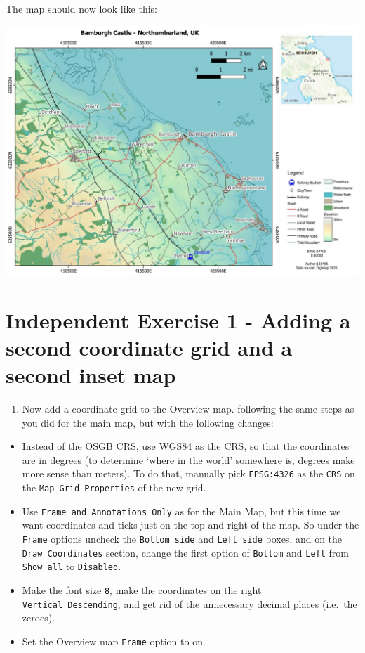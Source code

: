 \documentclass[
  letterpaper,
  DIV=11,
  numbers=noendperiod]{scrreprt}
\providecommand{\tightlist}{%
  \setlength{\itemsep}{0pt}\setlength{\parskip}{0pt}}\usepackage{longtable,booktabs,array}
\begin{document}
The map should now look like this:

\includegraphics{images/lab_8/lab8_fig20_almost__almost_done.jpg}

\section{Independent Exercise 1 - Adding a second coordinate grid and a
second inset
map}\label{independent-exercise-1---adding-a-second-coordinate-grid-and-a-second-inset-map}

\begin{enumerate}
\def\labelenumi{\arabic{enumi})}
\tightlist
\item
  Now add a coordinate grid to the Overview map. following the same
  steps as you did for the main map, but with the following changes:
\end{enumerate}

\begin{itemize}
\item
  Instead of the OSGB CRS, use WGS84 as the CRS, so that the coordinates
  are in degrees (to determine `where in the world' somewhere is,
  degrees make more sense than meters). To do that, manually pick
  \texttt{EPSG:4326} as the \texttt{CRS} on the
  \texttt{Map\ Grid\ Properties} of the new grid.
\item
  Use \texttt{Frame\ and\ Annotations\ Only} as for the Main Map, but
  this time we want coordinates and ticks just on the top and right of
  the map. So under the \texttt{Frame} options uncheck the
  \texttt{Bottom\ side} and \texttt{Left\ side} boxes, and on the
  \texttt{Draw\ Coordinates} section, change the first option of
  \texttt{Bottom} and \texttt{Left} from \texttt{Show\ all} to
  \texttt{Disabled}.
\item
  Make the font size \texttt{8}, make the coordinates on the right
  \texttt{Vertical\ Descending}, and get rid of the unnecessary decimal
  places (i.e.~the zeroes).
\item
  Set the Overview map \texttt{Frame} option to on.
\end{itemize}
\end{document}
